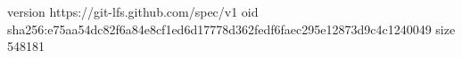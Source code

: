 version https://git-lfs.github.com/spec/v1
oid sha256:e75aa54dc82f6a84e8cf1ed6d17778d362fedf6faec295e12873d9c4c1240049
size 548181
